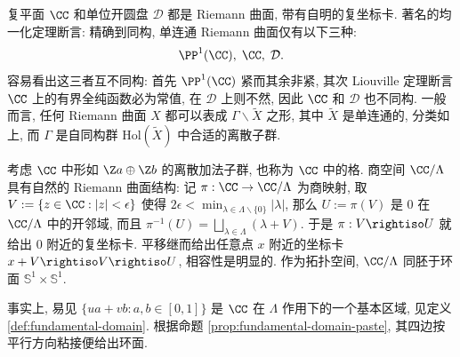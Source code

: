 \begin{example}
	复平面 $\CC$ 和单位开圆盘 $\mathcal{D}$ 都是 Riemann 曲面, 带有自明的复坐标卡. 著名的均一化定理断言: 精确到同构, 单连通 Riemann 曲面仅有以下三种:
	\[ \PP^1(\CC), \; \CC, \; \mathcal{D}. \]
	容易看出这三者互不同构: 首先 $\PP^1(\CC)$ 紧而其余非紧, 其次 Liouville 定理断言 $\CC$ 上的有界全纯函数必为常值, 在 $\mathcal{D}$ 上则不然, 因此 $\CC$ 和 $\mathcal{D}$ 也不同构. 一般而言, 任何 Riemann 曲面 $X$ 都可以表成 $\Gamma \backslash \tilde{X}$ 之形, 其中 $\tilde{X}$ 是单连通的, 分类如上, 而 $\Gamma$ 是自同构群 $\text{Hol}(\tilde{X})$ 中合适的离散子群.
\end{example}

\begin{example}[复环面]\label{eg:complex-tori}  
	考虑 $\CC$ 中形如 $\Z a \oplus \Z b$ 的离散加法子群, 也称为 $\CC$ 中的格. 商空间 $\CC/\Lambda$ 具有自然的 Riemann 曲面结构: 记 $\pi: \CC \to \CC/\Lambda$ 为商映射, 取 $V := \{z \in \CC: |z| < \epsilon \}$ 使得 $2\epsilon < \min_{\lambda \in \Lambda \smallsetminus \{0\}} |\lambda|$, 那么 $U := \pi(V)$ 是 $0$ 在 $\CC/\Lambda$ 中的开邻域, 而且 $\pi^{-1}(U) = \bigsqcup_{\lambda \in \Lambda} (\lambda + V)$. 于是 $\pi: V \rightiso U$ 就给出 $0$ 附近的复坐标卡. 平移继而给出任意点 $x$ 附近的坐标卡 $x+V \rightiso V \rightiso U$, 相容性是明显的. 作为拓扑空间, $\CC/\Lambda$ 同胚于环面 $\mathbb{S}^1 \times \mathbb{S}^1$.
	
	\begin{center}\end{center}

	事实上, 易见 $\{ua+vb : a, b \in [0,1] \}$ 是 $\CC$ 在 $\Lambda$ 作用下的一个基本区域, 见定义 \ref{def:fundamental-domain}. 根据命题 \ref{prop:fundamental-domain-paste}, 其四边按平行方向粘接便给出环面.
\end{example}

